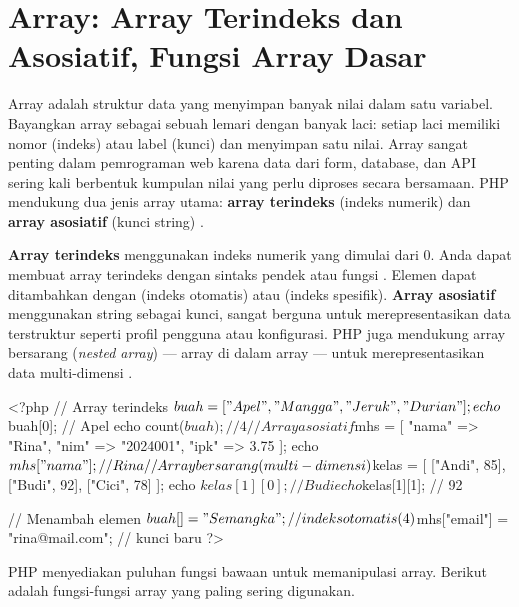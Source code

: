 ﻿\section{Array: Array Terindeks dan Asosiatif, Fungsi Array Dasar}

Array adalah struktur data yang menyimpan banyak nilai dalam satu variabel. Bayangkan array sebagai sebuah lemari dengan banyak laci: setiap laci memiliki nomor (indeks) atau label (kunci) dan menyimpan satu nilai. Array sangat penting dalam pemrograman web karena data dari form, database, dan API sering kali berbentuk kumpulan nilai yang perlu diproses secara bersamaan. PHP mendukung dua jenis array utama: \textbf{array terindeks} (indeks numerik) dan \textbf{array asosiatif} (kunci string) \cite{phpManual}.

\textbf{Array terindeks} menggunakan indeks numerik yang dimulai dari 0. Anda dapat membuat array terindeks dengan sintaks pendek \code{[...]} atau fungsi . Elemen dapat ditambahkan dengan  (indeks otomatis) atau  (indeks spesifik). \textbf{Array asosiatif} menggunakan string sebagai kunci, sangat berguna untuk merepresentasikan data terstruktur seperti profil pengguna atau konfigurasi. PHP juga mendukung array bersarang (\textit{nested array}) --- array di dalam array --- untuk merepresentasikan data multi-dimensi \cite{w3schoolsPhp}.

\begin{webcode}[language=PHP, caption={Array terindeks, asosiatif, dan bersarang}]
<?php
// Array terindeks
$buah = ["Apel", "Mangga", "Jeruk", "Durian"];
echo $buah[0];   // Apel
echo count($buah); // 4

// Array asosiatif
$mhs = [
    "nama" => "Rina",
    "nim"  => "2024001",
    "ipk"  => 3.75
];
echo $mhs["nama"];  // Rina

// Array bersarang (multi-dimensi)
$kelas = [
    ["Andi", 85],
    ["Budi", 92],
    ["Cici", 78]
];
echo $kelas[1][0];  // Budi
echo $kelas[1][1];  // 92

// Menambah elemen
$buah[] = "Semangka";       // indeks otomatis (4)
$mhs["email"] = "rina@mail.com";  // kunci baru
?>
\end{webcode}

PHP menyediakan puluhan fungsi bawaan untuk memanipulasi array. Berikut adalah fungsi-fungsi array yang paling sering digunakan.

